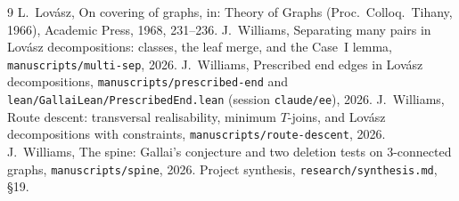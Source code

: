 \documentclass[11pt]{amsart}
\theoremstyle{definition}
\begin{document}
\begin{thebibliography}{9}
 L.~Lov\'asz, On covering of graphs, in: Theory of Graphs (Proc.\ Colloq.\ Tihany, 1966),
Academic Press, 1968, 231--236.
 J.~Williams, Separating many pairs in Lov\'asz decompositions: classes, the leaf merge,
and the Case~I lemma, \texttt{manuscripts/multi-sep}, 2026.
 J.~Williams, Prescribed end edges in Lov\'asz decompositions,
\texttt{manuscripts/prescribed-end} and \texttt{lean/GallaiLean/PrescribedEnd.lean} (session
\texttt{claude/ee}), 2026.
 J.~Williams, Route descent: transversal realisability, minimum $T$-joins, and Lov\'asz
decompositions with constraints, \texttt{manuscripts/route-descent}, 2026.
 J.~Williams, The spine: Gallai's conjecture and two deletion tests on $3$-connected
graphs, \texttt{manuscripts/spine}, 2026.
 Project synthesis, \texttt{research/synthesis.md}, \S19.
\end{thebibliography}
\end{document}
